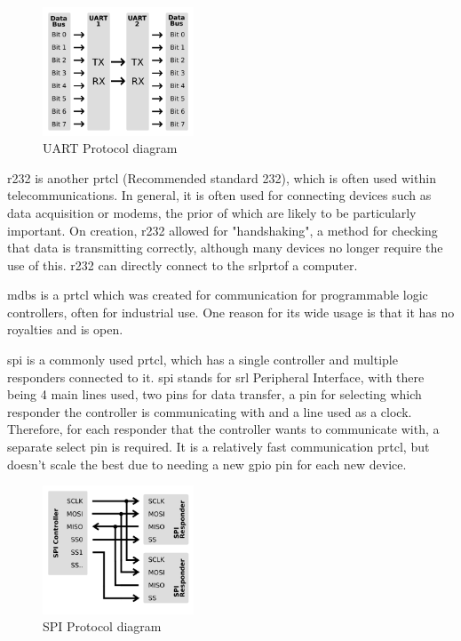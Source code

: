 \documentclass[a4paper,11pt]{report}
\begin{document}
\begin{figure}[H]
\centering
\includegraphics[width=0.4\textwidth]{UART}
\caption{UART Protocol diagram}
\end{figure}

\gls{r232} is another \gls{prtcl} (Recommended standard 232), which is often used within telecommunications. In general, it is often used for connecting devices such as data acquisition or modems, the prior of which are likely to be particularly important. On creation, \gls{r232} allowed for "handshaking", a method for checking that data is transmitting correctly, although many devices no longer require the use of this. \gls{r232} can directly connect to the \gls{srl}\gls{prt}of a computer.

\gls{mdbs} is a \gls{prtcl} which was created for communication for programmable logic controllers, often for industrial use. One reason for its wide usage is that it has no royalties and is open.

\gls{spi} is a commonly used \gls{prtcl}, which has a single controller and multiple responders connected to it. \gls{spi} stands for \gls{srl} Peripheral Interface, with there being 4 main lines used, two pins for data transfer, a pin for selecting which responder the controller is communicating with and a line used as a clock. Therefore, for each responder that the controller wants to communicate with, a separate select pin is required. It is a relatively fast communication \gls{prtcl}, but doesn't scale the best due to needing a new \gls{gpio} pin for each new device.

\begin{figure}[H]
\centering
\includegraphics[width=0.4\textwidth]{SPI}
\caption{SPI Protocol diagram}
\end{figure}
\end{document}
